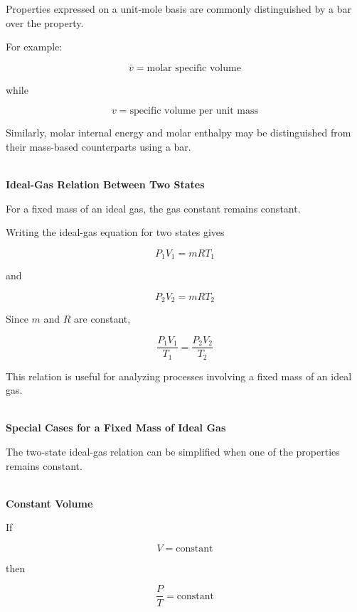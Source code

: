\documentclass[12pt]{article}
\begin{document}
Properties expressed on a unit-mole basis are commonly distinguished by a bar over the property.

For example:

\begin{equation*}
\bar{v}=\text{molar specific volume}
\end{equation*}

while

\begin{equation*}
v=\text{specific volume per unit mass}
\end{equation*}

Similarly, molar internal energy and molar enthalpy may be distinguished from their mass-based counterparts using a bar.

\textbf{\\ Ideal-Gas Relation Between Two States}

For a fixed mass of an ideal gas, the gas constant remains constant.

Writing the ideal-gas equation for two states gives

\begin{equation*}
P_1V_1=mRT_1
\end{equation*}

and

\begin{equation*}
P_2V_2=mRT_2
\end{equation*}

Since $m$ and $R$ are constant,

\begin{equation*}
\boxed{
\frac{P_1V_1}{T_1}
=
\frac{P_2V_2}{T_2}
}
\end{equation*}

This relation is useful for analyzing processes involving a fixed mass of an ideal gas.

\textbf{\\ Special Cases for a Fixed Mass of Ideal Gas}

The two-state ideal-gas relation can be simplified when one of the properties remains constant.

\textbf{\\ Constant Volume}

If

\begin{equation*}
V=\text{constant}
\end{equation*}

then

\begin{equation*}
\boxed{\frac{P}{T}=\text{constant}}
\end{equation*}
\end{document}
